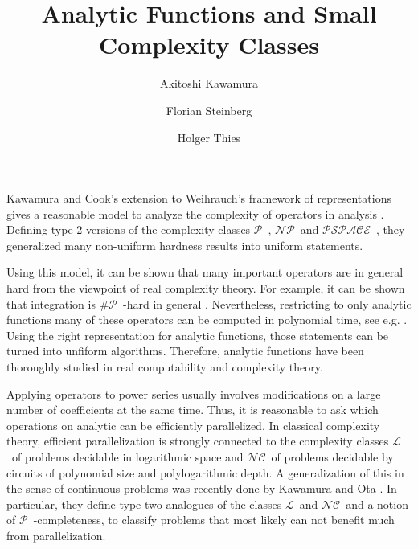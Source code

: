 \documentclass{llncs}
\newcommand{\p}{\ensuremath{\mathcal P}~}
\newcommand{\np}{\ensuremath{\mathcal{NP}}~}
\newcommand{\cl}{\ensuremath{\mathcal{L}}~}
\newcommand{\nc}{\ensuremath{\mathcal{NC}}~}
\newcommand{\sharpp}{\ensuremath{\# \mathcal{P}}~}
\newcommand{\pspace}{\ensuremath{ \mathcal{PSPACE}}~}
\begin{document}
\title{Analytic Functions and Small Complexity Classes}


\author{Akitoshi Kawamura \and Florian Steinberg \and Holger Thies}

\maketitle

Kawamura and Cook's extension to Weihrauch's framework of representations \cite{Weihrauch} gives a reasonable model to analyze the complexity of operators in analysis \cite{AkiACM}.
Defining type-2 versions of the complexity classes \p, \np and \pspace, they generalized many non-uniform hardness results into uniform statements.

Using this model, it can be shown that many important operators are in general hard from the viewpoint of real complexity theory. 
For example, it can be shown that integration is \sharpp-hard in general \cite{MR748898,AkiACM}.
Nevertheless, restricting to only analytic functions many of these operators can be computed in polynomial time, see e.g. \cite{MR1137517, Kawamura2012}.  
Using the right representation for analytic functions, those statements can be turned into unfiform algorithms.
Therefore, analytic functions have been thoroughly studied in real computability and complexity theory.

Applying operators to power series usually involves modifications on a large number of coefficients at the same time.
Thus, it is reasonable to ask which operations on analytic can be efficiently parallelized.
In classical complexity theory, efficient parallelization is strongly connected to the complexity classes \cl of problems decidable in logarithmic space and \nc of problems decidable by circuits of polynomial size and polylogarithmic depth.
A generalization of this in the sense of continuous problems was recently done by Kawamura and Ota \cite{Kawamura2014}.
In particular, they define type-two analogues of the classes \cl and \nc and a notion of \p-completeness, to classify problems that most likely can not benefit much from parallelization.
\end{document}
